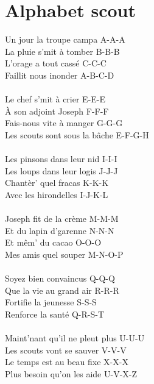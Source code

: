 \section*{Alphabet scout}
Un jour la troupe campa A-A-A\\
La pluie s'mit à tomber B-B-B\\
L'orage a tout cassé C-C-C\\
Faillit nous inonder A-B-C-D\\
\\
Le chef s'mit à crier E-E-E\\
À son adjoint Joseph F-F-F\\
Fais-nous vite à manger G-G-G\\
Les scouts sont sous la bâche E-F-G-H\\
\\
Les pinsons dans leur nid I-I-I\\
Les loups dans leur logis J-J-J\\
Chantèr' quel fracas K-K-K\\
Avec les hirondelles I-J-K-L\\
\\
Joseph fit de la crème M-M-M\\
Et du lapin d'garenne N-N-N\\
Et mêm' du cacao O-O-O\\
Mes amis quel souper M-N-O-P\\
\\
Soyez bien convaincus Q-Q-Q\\
Que la vie au grand air R-R-R\\
Fortifie la jeunesse S-S-S\\
Renforce la santé Q-R-S-T\\
\\
Maint'nant qu'il ne pleut plus U-U-U \\
Les scouts vont se sauver V-V-V\\
Le temps est au beau fixe X-X-X\\
Plus besoin qu'on les aide U-V-X-Z\\